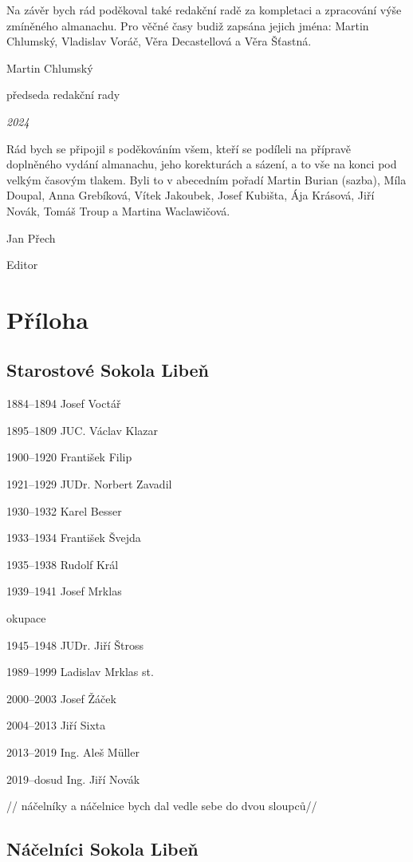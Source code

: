 Na závěr bych rád poděkoval také redakční radě za kompletaci a
zpracování výše zmíněného almanachu. Pro věčné časy budiž zapsána jejich
jména: Martin Chlumský, Vladislav Voráč, Věra Decastellová a Věra
Šťastná.

Martin Chlumský

předseda redakční rady

\emph{2024}

Rád bych se připojil s poděkováním všem, kteří se podíleli na přípravě
doplněného vydání almanachu, jeho korekturách a sázení, a to vše na
konci pod velkým časovým tlakem. Byli to v abecedním pořadí Martin
Burian (sazba), Míla Doupal, Anna Grebíková, Vítek Jakoubek, Josef
Kubišta, Ája Krásová, Jiří Novák, Tomáš Troup a Martina Waclawičová.

Jan Přech

Editor

\section{Příloha}\label{pux159uxedloha}

\subsection{\texorpdfstring{Starostové Sokola Libeň
}{Starostové Sokola Libeň }}\label{starostovuxe9-sokola-libeux148}

1884--1894 Josef Voctář

1895--1809 JUC. Václav Klazar

1900--1920 František Filip

1921--1929 JUDr. Norbert Zavadil

1930--1932 Karel Besser

1933--1934 František Švejda

1935--1938 Rudolf Král

1939--1941 Josef Mrklas

okupace

1945--1948 JUDr. Jiří Štross

1989--1999 Ladislav Mrklas st.

2000--2003 Josef Žáček

2004--2013 Jiří Sixta

2013--2019 Ing. Aleš Müller

2019--dosud Ing. Jiří Novák

// náčelníky a náčelnice bych dal vedle sebe do dvou sloupců//

\subsection{Náčelníci Sokola
Libeň}\label{nuxe1ux10delnuxedci-sokola-libeux148}

